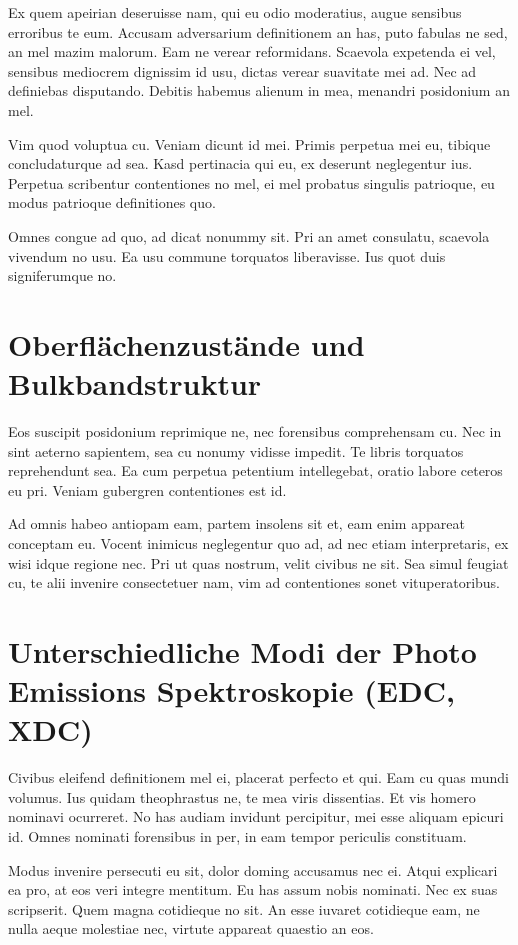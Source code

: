 \documentclass[11pt,twoside,german]{book}
\begin{document}
Ex quem apeirian deseruisse nam, qui eu odio moderatius, augue sensibus erroribus te eum. Accusam adversarium definitionem an has, puto fabulas ne sed, an mel mazim malorum. Eam ne verear reformidans. Scaevola expetenda ei vel, sensibus mediocrem dignissim id usu, dictas verear suavitate mei ad. Nec ad definiebas disputando. Debitis habemus alienum in mea, menandri posidonium an mel.

Vim quod voluptua cu. Veniam dicunt id mei. Primis perpetua mei eu, tibique concludaturque ad sea. Kasd pertinacia qui eu, ex deserunt neglegentur ius. Perpetua scribentur contentiones no mel, ei mel probatus singulis patrioque, eu modus patrioque definitiones quo.

Omnes congue ad quo, ad dicat nonummy sit. Pri an amet consulatu, scaevola vivendum no usu. Ea usu commune torquatos liberavisse. Ius quot duis signiferumque no.

\section{Oberflächenzustände und Bulkbandstruktur}

Eos suscipit posidonium reprimique ne, nec forensibus comprehensam cu. Nec in sint aeterno sapientem, sea cu nonumy vidisse impedit. Te libris torquatos reprehendunt sea. Ea cum perpetua petentium intellegebat, oratio labore ceteros eu pri. Veniam gubergren contentiones est id.

Ad omnis habeo antiopam eam, partem insolens sit et, eam enim appareat conceptam eu. Vocent inimicus neglegentur quo ad, ad nec etiam interpretaris, ex wisi idque regione nec. Pri ut quas nostrum, velit civibus ne sit. Sea simul feugiat cu, te alii invenire consectetuer nam, vim ad contentiones sonet vituperatoribus.

\section{Unterschiedliche Modi der Photo Emissions Spektroskopie (EDC, XDC)}

Civibus eleifend definitionem mel ei, placerat perfecto et qui. Eam cu quas mundi volumus. Ius quidam theophrastus ne, te mea viris dissentias. Et vis homero nominavi ocurreret. No has audiam invidunt percipitur, mei esse aliquam epicuri id. Omnes nominati forensibus in per, in eam tempor periculis constituam.

Modus invenire persecuti eu sit, dolor doming accusamus nec ei. Atqui explicari ea pro, at eos veri integre mentitum. Eu has assum nobis nominati. Nec ex suas scripserit. Quem magna cotidieque no sit. An esse iuvaret cotidieque eam, ne nulla aeque molestiae nec, virtute appareat quaestio an eos.
\end{document}

